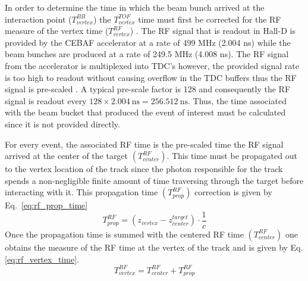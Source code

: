 In order to determine the time in which the beam bunch arrived at the interaction point ($T^{BB}_{vertex}$) the $T^{TOF}_{vertex}$ time must first be corrected for the RF measure of the vertex time ($T^{RF}_{vertex}$) .  The RF signal that is readout in Hall-D is provided by the CEBAF accelerator at a rate of 499 MHz (2.004 ns) while the beam bunches are produced at a rate of  249.5 MHz (4.008 ns).  The RF signal from the accelerator is multiplexed into TDC's however, the provided signal rate is too high to readout without causing overflow in the TDC buffers thus the RF signal is pre-scaled \cite{mattione_rf_wiki}.  A typical pre-scale factor is 128 and consequently the RF signal is readout every $\mathrm{128 \times 2.004\ ns = 256.512\ ns}$.  Thus, the time associated with the beam bucket that produced the event of interest must be calculated since it is not provided directly.

For every event, the associated RF time is the pre-scaled time the RF signal arrived at the center of the target $(T^{RF}_{center})$. This time must be propagated out to the vertex location of the track since the photon responsible for the track spends a non-negligible finite amount of time traversing through the target before interacting with it. This propagation time $(T^{RF}_{prop})$ correction is given by Eq.~\ref{eq:rf_prop_time}
	\begin{equation} \label{eq:rf_prop_time}
		T^{RF}_{prop} = (z_{vertex} - z^{target}_{center}) \cdot \frac{1}{c} 
	\end{equation} 
Once the propagation time is summed with the centered RF time $(T^{RF}_{center})$ one obtains the measure of the RF time at the vertex of the track and is given by Eq. \ref{eq:rf_vertex_time}.
	\begin{equation} \label{eq:rf_vertex_time}
		T^{RF}_{vertex} = T^{RF}_{center} + T^{RF}_{prop}
	\end{equation}

